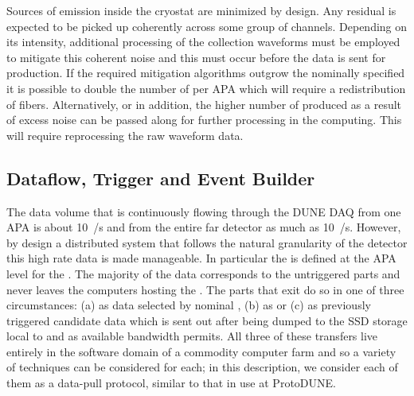 Sources of  emission inside the cryostat are minimized by
design. 
Any residual  is expected to be picked up coherently across
some group of channels. 
Depending on its intensity, additional processing of the collection
waveforms must be employed to mitigate this coherent noise and this
must occur before the data is sent for 
production. 
If the required mitigation algorithms outgrow the nominally specified
  it is possible to double the number of
 per APA which will require a redistribution of fibers. 
Alternatively, or in addition, the higher number of
 produced as a result of excess noise can be
passed along for further processing in the  computing. 
This will require reprocessing the raw waveform data.



\subsection{Dataflow, Trigger and Event Builder}
\label{sec:fdsp-daq-hlt}


The data volume that is continuously flowing through the DUNE
  DAQ from one APA is about \SI{10}{\GB/\s}
and from the entire far detector as much as \SI{10}{\TB/\s}.
However, by design a distributed system that follows the natural
granularity of the detector this high rate data is made manageable.
In particular the  is defined at the APA level for
the  .
The majority of the data corresponds to the untriggered parts and
never leaves the computers hosting the .
The parts that exit do so in one of three circumstances: (a) as data
selected by nominal , (b) as  or
(c) as previously triggered  candidate data which is
sent out after being dumped to the SSD storage local to
 and as available bandwidth permits. 
All three of these transfers live entirely in the software domain of a
commodity computer farm and so a variety of techniques can be
considered for each; in this description, we consider each of them as
a data-pull protocol, similar to that in use at ProtoDUNE.


